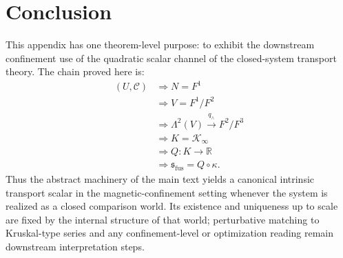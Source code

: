 \section{Conclusion}
\label{sec:fusion-conclusion}
This appendix has one theorem-level purpose:
to exhibit the downstream confinement use of the quadratic scalar channel
of the closed-system transport theory.
The chain proved here is:
\begin{align*}
	(U,\mathcal{C}) & \Longrightarrow N=F^1                                \\
	                & \Longrightarrow V=F^1/F^2                            \\
	                & \Longrightarrow \Lambda^2(V) \xrightarrow{q_{\wedge}} F^2/F^3 \\
	                & \Longrightarrow K = \mathcal{K}_\infty               \\
	                & \Longrightarrow Q : K \to \mathbb{R}                 \\
	                & \Longrightarrow \mathfrak s_{\mathrm{fus}} = Q \circ \kappa .
\end{align*}
Thus the abstract machinery of the main text yields a canonical intrinsic
transport scalar in the magnetic-confinement setting whenever the system is
realized as a closed comparison world.  Its existence and uniqueness up to
scale are fixed by the internal structure of that world; perturbative
matching to Kruskal-type series and any confinement-level or optimization
reading remain downstream interpretation steps.

\begin{chapterclosing}
\end{chapterclosing}
